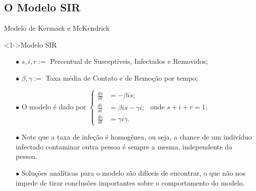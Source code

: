 \documentclass{beamer}
\theoremstyle{plain}
\theoremstyle{definition}
\begin{document}
\subsection{O Modelo SIR}
\begin{frame}{Modelo de Kermack e McKendrick}

    \footnotesize
    \begin{exampleblock}
        <1->{Modelo SIR}
        \begin{itemize}
            \item [$\bullet$] $s,i,r :=$ Percentual de Susceptíveis, Infectados e Removidos;
            \item [$\bullet$] $\beta, \gamma := $ Taxa média de Contato e de Remoção por tempo;
            \item [$\bullet$] O modelo é dado por
                $ 
                \begin{cases}
                    \frac{ds}{dt} &= -\beta i s; \\ 
                    \frac{di}{dt} &= \beta i s - \gamma i;  \\
                    \frac{dr}{dt} &= \gamma i \gamma. 
                \end{cases}
                $ 
                onde $s + i + r = 1$;
            \item [$\bullet$] Note que a taxa de infeção é homogênea, ou seja, a chance de um indivíduo
                infectado contaminar outra pessoa é sempre a mesma, independente da pessoa. 
            \item [$\bullet$] Soluções analíticas para o modelo são difíceis de encontrar, o que não 
                nos impede de tirar conclusões importantes sobre o comportamento do modelo.

        \end{itemize}

    \end{exampleblock} 
    
\end{frame}
\end{document}
